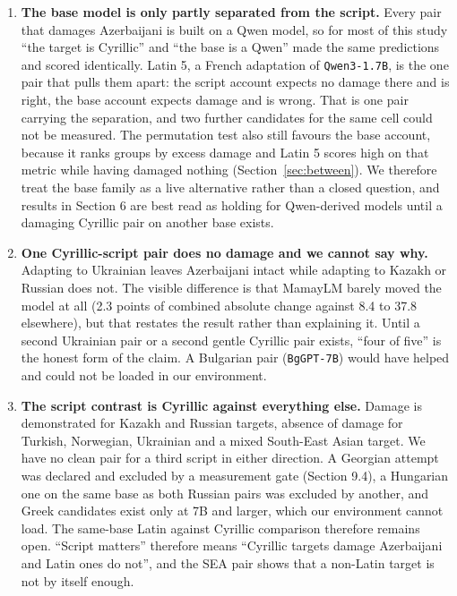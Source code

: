 \documentclass[final]{clv2025}
\begin{document}
\begin{enumerate}
\item \textbf{The base model is only partly separated from the script.} Every
pair that damages Azerbaijani is built on a Qwen model, so for most of this
study ``the target is Cyrillic'' and ``the base is a Qwen'' made the same
predictions and scored identically. Latin 5, a French adaptation of
\texttt{Qwen3-1.7B}, is the one pair that pulls them apart: the script account
expects no damage there and is right, the base account expects damage and is
wrong. That is one pair carrying the separation, and two further candidates for
the same cell could not be measured. The permutation test also still favours
the base account, because it ranks groups by excess damage and Latin 5 scores
high on that metric while having damaged nothing
(Section~\ref{sec:between}). We therefore treat the base family as a live
alternative rather than a closed question, and results in Section 6 are best
read as holding for Qwen-derived models until a damaging Cyrillic pair on
another base exists.

\item \textbf{One Cyrillic-script pair does no damage and we cannot say why.}
Adapting to Ukrainian leaves Azerbaijani intact while adapting to Kazakh or
Russian does not. The visible difference is that MamayLM barely moved the model
at all (2.3 points of combined absolute change against 8.4 to 37.8 elsewhere),
but that restates the result rather than explaining it. Until a second
Ukrainian pair or a second gentle Cyrillic pair exists, ``four of five'' is the
honest form of the claim. A Bulgarian pair (\texttt{BgGPT-7B}) would have
helped and could not be loaded in our environment.

\item \textbf{The script contrast is Cyrillic against everything else.} Damage
is demonstrated for Kazakh and Russian targets, absence of damage for Turkish,
Norwegian, Ukrainian and a mixed South-East Asian target. We have no clean pair
for a third script in either direction. A Georgian attempt was declared and
excluded by a measurement gate (Section 9.4), a Hungarian one on the same base
as both Russian pairs was excluded by another, and Greek candidates exist only
at 7B and larger, which our environment cannot load. The same-base Latin
against Cyrillic comparison therefore remains open. ``Script matters''
therefore means ``Cyrillic targets damage Azerbaijani and Latin ones do not'',
and the SEA pair shows that a non-Latin target is not by itself enough.


\end{enumerate}
\end{document}

